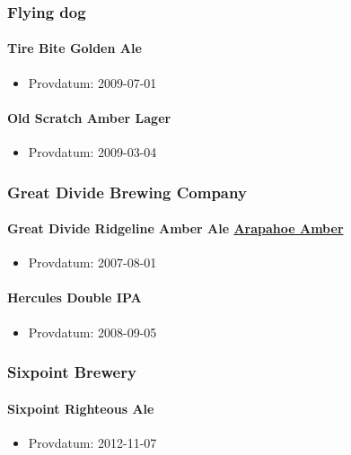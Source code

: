 \documentclass[11pt]{article}
\begin{document}
\subsubsection{Flying dog}
\label{sec:orgebeed63}
\paragraph{Tire Bite Golden Ale}
\label{sec:org476c81b}
\begin{itemize}
\item Provdatum: 2009-07-01
\end{itemize}
\paragraph{Old Scratch Amber Lager}
\label{sec:org6391f59}
\begin{itemize}
\item Provdatum: 2009-03-04
\end{itemize}
\subsubsection{Great Divide Brewing Company}
\label{sec:org4a462b4}
\paragraph{Great Divide Ridgeline Amber Ale \underline{Arapahoe Amber}}
\label{sec:org9c6d713}
\begin{itemize}
\item Provdatum: 2007-08-01
\end{itemize}
\paragraph{Hercules Double IPA}
\label{sec:orgfcc93c3}
\begin{itemize}
\item Provdatum: 2008-09-05
\end{itemize}
\subsubsection{Sixpoint Brewery}
\label{sec:org35e8cb6}
\paragraph{Sixpoint Righteous Ale}
\label{sec:orgd9dc227}
\begin{itemize}
\item Provdatum: 2012-11-07
\end{itemize}
\end{document}
